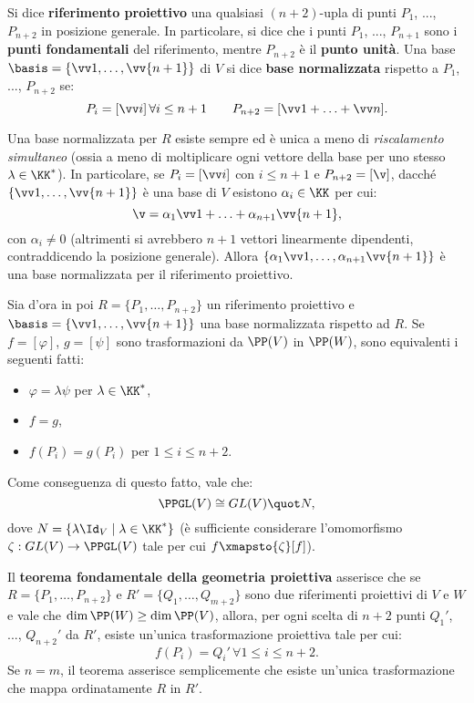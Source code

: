 \documentclass[10pt,landscape]{article}
\begin{document}
\begin{multicols}{3}
		
		
		Si dice \textbf{riferimento proiettivo} una qualsiasi $(n+2)$-upla di punti
		$P_1$, ..., $P_{n+2}$ in posizione generale. In particolare, si dice che i punti
		$P_1$, ..., $P_{n+1}$ sono i \textbf{punti fondamentali} del riferimento, mentre
		$P_{n+2}$ è il \textbf{punto unità}. Una base $\basis = \{\vv 1, \ldots, \vv{n+1}\}$
		di $V$ si dice \textbf{base normalizzata} rispetto a $P_1$, ..., $P_{n+2}$ se:
		\[ P_i = [\vv i] \, \forall i \leq n+1 \qquad P_{n+2} = [\vv 1 + \ldots + \vv n]. \]
		
		Una base normalizzata per $R$ esiste sempre ed
		è unica a meno di \textit{riscalamento simultaneo}
		(ossia a meno di moltiplicare ogni vettore della base per uno stesso $\lambda \in \KK^*$). In particolare, se $P_i = [\vv i]$ con $i \leq n+1$ e
		$P_{n+2} = [\v]$, dacché $\{\vv 1, \ldots, \vv {n+1}\}$ è una base di $V$
		esistono $\alpha_i \in \KK$ per cui:
		\[ \v = \alpha_1 \vv 1 + \ldots + \alpha_{n+1} \vv{n+1}, \]
		con $\alpha_i \neq 0$ (altrimenti si avrebbero $n+1$ vettori linearmente
		dipendenti, contraddicendo la posizione generale). Allora
		$\{\alpha_1 \vv 1, \ldots, \alpha_{n+1} \vv {n+1}\}$ è una base normalizzata
		per il riferimento proiettivo. \medskip
		
		
		Sia d'ora in poi $R = \{P_1, \ldots, P_{n+2}\}$ un riferimento proiettivo e
		$\basis = \{\vv 1, \ldots, \vv{n+1}\}$ una base normalizzata rispetto ad $R$.
		Se $f = [\varphi]$, $g = [\psi]$ sono trasformazioni da $\PP(V)$ in $\PP(W)$, sono equivalenti i seguenti fatti:
		
		\begin{itemize}
			\item $\varphi = \lambda \psi$ per $\lambda \in \KK^*$,
			\item $f = g$,
			\item $f(P_i) = g(P_i)$ per $1 \leq i \leq n+2$.
		\end{itemize}
		
		Come conseguenza di questo fatto, vale che:
		\[ \PPGL(V) \cong GL(V) \quot N, \]
		dove $N = \{ \lambda \Id_V \mid \lambda \in \KK^* \}$ (è sufficiente
		considerare l'omomorfismo $\zeta : GL(V) \to \PPGL(V)$ tale per cui
		$f \xmapsto{\zeta} [f]$).
		
		Il \textbf{teorema fondamentale della geometria proiettiva}
		asserisce che se $R = \{P_1, \ldots, P_{n+2}\}$ e $R' = \{Q_1, \ldots, Q_{m+2}\}$ sono
		due riferimenti proiettivi di $V$ e $W$ e vale che $\dim \PP(W) \geq \dim \PP(V)$,
		allora, per ogni scelta di $n+2$ punti $Q_1'$, ..., $Q_{n+2}'$ da $R'$, esiste
		un'unica trasformazione proiettiva tale per cui:
		\[ f(P_i) = Q_i' \, \forall 1 \leq i \leq n+2. \]
		Se $n=m$, il teorema asserisce semplicemente che esiste un'unica trasformazione
		che mappa ordinatamente $R$ in $R'$. \medskip
		

\end{multicols}
\end{document}
